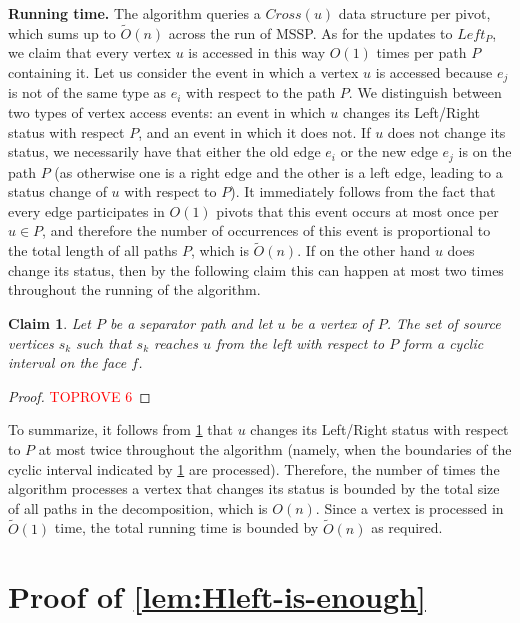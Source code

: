 \documentclass{article}
\newtheorem{claim}{Claim}
\newcommand{\Otild}{\tilde{O}}
\begin{document}
    \medskip
\noindent
{\bf Running time.}
    The algorithm queries a $Cross(u)$ data structure per pivot, which sums up to $\Otild(n)$ across the run of MSSP.
    As for the updates to $Left_P$, we claim that every vertex $u$ is accessed in this way $O(1)$ times per path $P$ containing it.
    Let us consider the event in which a vertex $u$ is accessed because $e_j$ is not of the same type as $e_i$ with respect to the path $P$.
    We distinguish between two types of vertex access events: an event in which $u$ changes its Left/Right status with respect $P$, and an event in which it does not.
    If $u$ does not change its status, we necessarily have that either the old edge $e_i$ or the new edge $e_j$ is on the path $P$ (as otherwise one is a right edge and the other is a left edge, leading to a status change of $u$ with respect to $P$).
    It immediately follows from the fact that every edge participates in $O(1)$ pivots that this event occurs at most once per $u\in P$, and therefore the number of occurrences of this event is proportional to the total length of all paths $P$, which is $\Otild(n)$.
   If on the other hand $u$ does change its status, then by the following claim this can happen at most two times throughout the running of the algorithm.


    \begin{claim}\label{clm:cyclicleftright}
        Let $P$ be a separator path and let $u$ be a vertex of $P$.
        The set of source vertices $s_k$ such that $s_k$ reaches $u$ from the left with respect to $P$ form a cyclic interval on the face $f$.
    \end{claim}
    \begin{proof}\textcolor{red}{TOPROVE 6}\end{proof}

    To summarize, it follows from \cref{clm:cyclicleftright} that $u$ changes its Left/Right status with respect to $P$ at most twice throughout the algorithm (namely, when the boundaries of the cyclic interval indicated by \cref{clm:cyclicleftright} are processed).
    Therefore, the number of times the algorithm processes a vertex that changes its status is bounded by the total size of all paths in the decomposition, which is $O(n)$.
    Since a vertex is processed in $\Otild
    (1)$ time, the total running time is bounded by $\Otild(n)$ as required.



\section{Proof of \cref{lem:Hleft-is-enough}}\label{app:missing_proof}
\end{document}
